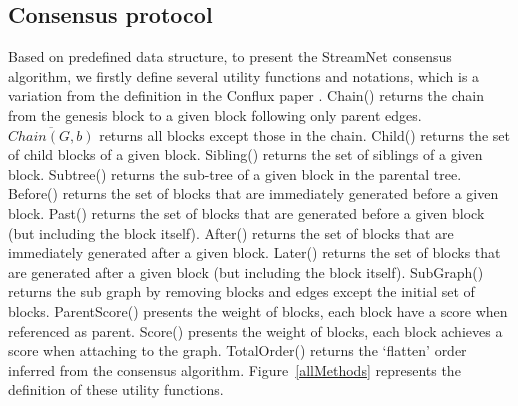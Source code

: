 



\subsection{Consensus protocol}
Based on predefined data structure, to present the StreamNet consensus algorithm, 
we firstly define several utility functions and notations, which is a variation from the definition in the Conflux paper \cite{li2018scaling}. 
Chain() returns the chain from the genesis block to a given block following only parent edges. 
$\overline{Chain(G,b)}$ returns all blocks except those in the chain.
Child() returns the set of child blocks of a given block. 
Sibling() returns the set of siblings of a given block. 
Subtree() returns the sub-tree of a given block in the parental tree. 
Before() returns the set of blocks that are immediately generated before a given block. 
Past() returns the set of blocks that are generated before a given block (but including the block itself).
After() returns the set of blocks that are immediately generated after a given block. 
Later() returns the set of blocks that are generated after a given block (but including the block itself).
SubGraph() returns the sub graph by removing blocks and edges except the initial set of blocks.
ParentScore() presents the weight of blocks, each block have a score when referenced as parent. 
Score() presents the weight of blocks, each block achieves a score when attaching to the graph. 
TotalOrder() returns the `flatten' order inferred from the consensus algorithm.
Figure~\ref{allMethods} represents the definition of these utility functions. 

